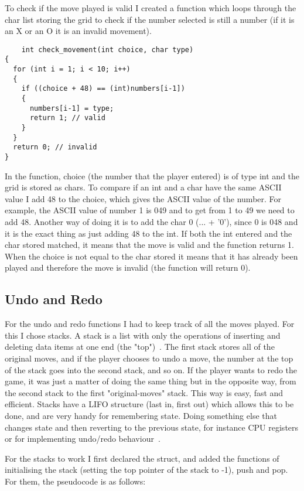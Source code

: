 \documentclass[10pt, a4paper]{article}
\begin{document}
To check if the move played is valid I created a function which loops through the char list storing the grid to check if the number selected is still a number (if it is an X or an O it is an invalid movement).

\begin{lstlisting}
    int check_movement(int choice, char type)
{
  for (int i = 1; i < 10; i++)
  {
    if ((choice + 48) == (int)numbers[i-1])
    {
      numbers[i-1] = type;
      return 1; // valid
    }
  }
  return 0; // invalid
}
\end{lstlisting}

In the function, choice (the number that the player entered) is of type int and the grid is stored as chars. To compare if an int and a char have the same ASCII value I add 48 to the choice, which gives the ASCII value of the number. For example, the ASCII value of number 1 is 049 and to get from 1 to 49 we need to add 48. Another way of doing it is to add the char 0 (... + '0'), since 0 is 048 and it is the exact thing as just adding 48 to the int. If both the int entered and the char stored matched, it means that the move is valid and the function returns 1. When the choice is not equal to the char stored it means that it has already been played and therefore the move is invalid (the function will return 0).

    \subsection{Undo and Redo}

For the undo and redo functions I had to keep track of all the moves played. For this I chose stacks. A stack is a list with only the operations of inserting and deleting data items at one end (the "top")~\cite{mehlhorn_sanders_2008}. The first stack stores all of the original moves, and if the player chooses to undo a move, the number at the top of the stack goes into the second stack, and so on. If the player wants to redo the game, it was just a matter of doing the same thing but in the opposite way, from the second stack to the first "original-moves" stack. This way is easy, fast and efficient. Stacks have a LIFO structure (last in, first out) which allows this to be done, and are very handy for remembering state. Doing something else that changes state and then reverting to the previous state, for instance CPU registers or for implementing undo/redo behaviour~\cite{raghuwanshi_2016}.

For the stacks to work I first declared the struct, and added the functions of initialising the stack (setting the top pointer of the stack to -1), push and pop. For them, the pseudocode is as follows:
\end{document}
